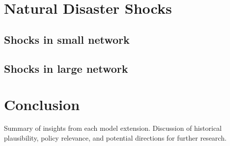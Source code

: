 \documentclass[12pt]{article}
\begin{document}
\section{Natural Disaster Shocks}
\subsection{Shocks in small network}
\subsection{Shocks in large network}
\section{Conclusion}
Summary of insights from each model extension. Discussion of historical plausibility, policy relevance, and potential directions for further research.

  
\end{document}
